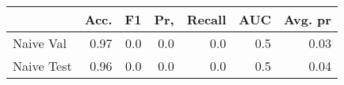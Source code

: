 \begin{tabular}{lrrrrrr}
\toprule
{} &  Acc. &   F1 &  Pr, &  Recall &  AUC &  Avg. pr \\
\midrule
Naive Val  &  0.97 &  0.0 &  0.0 &     0.0 &  0.5 &     0.03 \\
Naive Test &  0.96 &  0.0 &  0.0 &     0.0 &  0.5 &     0.04 \\
\bottomrule
\end{tabular}
